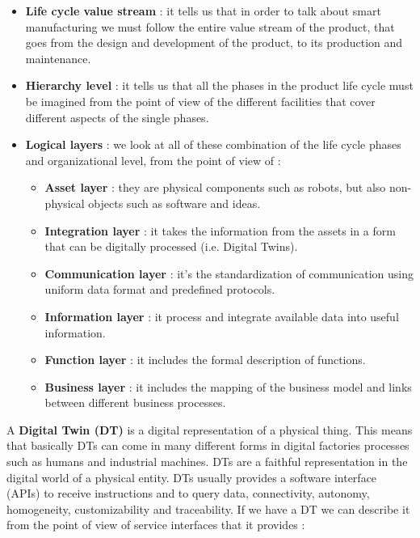 \documentclass[11pt]{article}
\begin{document}
\begin{itemize}
\item \textbf{Life cycle value stream} : it tells us that in order to talk about smart manufacturing we must follow the entire value stream of the product, that goes from the design and development of the product, to its production and maintenance.

\item \textbf{Hierarchy level} : it tells us that all the phases in the product life cycle must be imagined from the point of view of the different facilities that cover different aspects of the single phases.

\item \textbf{Logical layers} : we look at all of these combination of the life cycle phases and organizational level, from the point of view of :

\begin{itemize}
\item \textbf{Asset layer} : they are physical components such as robots, but also non-physical objects such as software and ideas.

\item \textbf{Integration layer} : it takes the information from the assets in a form that can be digitally processed (i.e. Digital Twins).

\item \textbf{Communication layer} : it's the standardization of communication using uniform data format and predefined protocols.

\item \textbf{Information layer} : it process and integrate available data into useful information.

\item \textbf{Function layer} : it includes the formal description of functions.

\item \textbf{Business layer} : it includes the mapping of the business model and links between different business processes.
\end{itemize}
\end{itemize}

A \textbf{Digital Twin (DT)} is a digital representation of a physical thing. This means that basically DTs can come in many different forms in digital factories processes such as humans and industrial machines. DTs are a faithful representation in the digital world of a physical entity. DTs usually provides a software interface (APIs) to receive instructions and to query data, connectivity, autonomy, homogeneity, customizability and traceability. If we have a DT we can describe it from the point of view of service interfaces that it provides :
\end{document}

